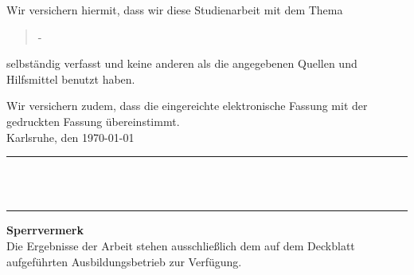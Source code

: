Wir versichern hiermit, dass wir diese Studienarbeit mit dem Thema
\begin{quote}
\textit{\titel} -\textit{ \untertitel }
\end{quote}
selbständig verfasst und keine anderen als die angegebenen Quellen und Hilfsmittel benutzt haben.


Wir versichern zudem, dass die eingereichte elektronische Fassung mit der gedruckten Fassung übereinstimmt.\\[10ex]

Karlsruhe, den \today \\[4ex]


\rule[-0.2cm]{5cm}{0.5pt} \\

\textsc{\autor} \\[10ex]

\hrule 
\vspace*{1.0cm}
\noindent \textbf{\Large{Sperrvermerk}}\\
\normalsize
Die Ergebnisse der Arbeit stehen ausschließlich dem auf dem Deckblatt aufgeführten Ausbildungsbetrieb zur Verfügung.